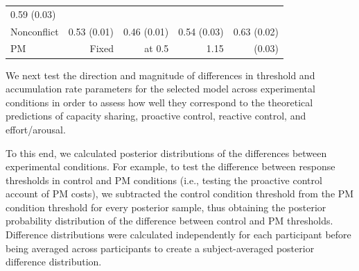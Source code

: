 \documentclass[11pt,]{article}
\begin{document}
\begin{longtable}[]{@{}lrrrr@{}}
\begin{minipage}[t]{0.21\columnwidth}
0.59 (0.03)\strut
\end{minipage}\tabularnewline
\begin{minipage}[t]{0.16\columnwidth}\raggedright\strut
Nonconflict\strut
\end{minipage} & \begin{minipage}[t]{0.14\columnwidth}\raggedleft\strut
0.53 (0.01)\strut
\end{minipage} & \begin{minipage}[t]{0.16\columnwidth}\raggedleft\strut
0.46 (0.01)\strut
\end{minipage} & \begin{minipage}[t]{0.19\columnwidth}\raggedleft\strut
0.54 (0.03)\strut
\end{minipage} & \begin{minipage}[t]{0.21\columnwidth}\raggedleft\strut
0.63 (0.02)\strut
\end{minipage}\tabularnewline
\begin{minipage}[t]{0.16\columnwidth}\raggedright\strut
PM\strut
\end{minipage} & \begin{minipage}[t]{0.14\columnwidth}\raggedleft\strut
Fixed\strut
\end{minipage} & \begin{minipage}[t]{0.16\columnwidth}\raggedleft\strut
at 0.5\strut
\end{minipage} & \begin{minipage}[t]{0.19\columnwidth}\raggedleft\strut
1.15\strut
\end{minipage} & \begin{minipage}[t]{0.21\columnwidth}\raggedleft\strut
(0.03)\strut
\end{minipage}\tabularnewline
\bottomrule
\end{longtable}

We next test the direction and magnitude of differences in threshold and
accumulation rate parameters for the selected model across experimental
conditions in order to assess how well they correspond to the
theoretical predictions of capacity sharing, proactive control, reactive
control, and effort/arousal.

To this end, we calculated posterior distributions of the differences
between experimental conditions. For example, to test the difference
between response thresholds in control and PM conditions (i.e., testing
the proactive control account of PM costs), we subtracted the control
condition threshold from the PM condition threshold for every posterior
sample, thus obtaining the posterior probability distribution of the
difference between control and PM thresholds. Difference distributions
were calculated independently for each participant before being averaged
across participants to create a subject-averaged posterior difference
distribution.
\end{document}
